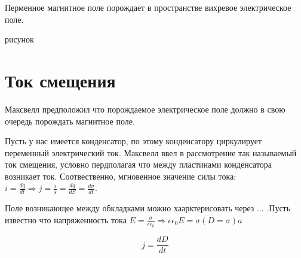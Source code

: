 \documentclass[../main.tex]{subfiles}
\begin{document}
Перменное магнитное поле порождает в пространстве вихревое электрическое поле.

рисунок

\section{Ток смещения}
Максвелл предположил что порождаемое электрическое поле должно в свою очередь порождать магнитное поле.

Пусть у нас имеется конденсатор, по этому конденсатору циркулирует переменный электрический ток. Максвелл ввел в рассмотрение так называемый ток смещения, условно пердполагая
что между пластинами конденсатора возникает ток. Соотвественно, мгновенное значение силы тока: $i = \frac{dq}{dt} \Rightarrow j = \frac{i}{s} = \frac{dq}{dS} = \frac{d \sigma}{dt}$.

Поле возникающее между обкладками можно хаарктерисовать через ... .Пусть известно что напряженность тока $E = \frac{\sigma}{\epsilon \epsilon_0} \Rightarrow \epsilon \epsilon_0 E = \sigma (D = \sigma)a$

\[j = \frac{d D}{dt}\]
\end{document}
